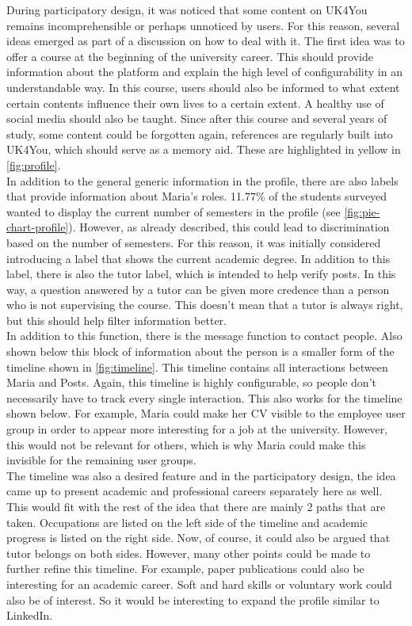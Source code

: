 During participatory design, it was noticed that some content on UK4You remains incomprehensible or perhaps unnoticed by users.
For this reason, several ideas emerged as part of a discussion on how to deal with it.
The first idea was to offer a course at the beginning of the university career.
This should provide information about the platform and explain the high level of configurability in an understandable way.
In this course, users should also be informed to what extent certain contents influence their own lives to a certain extent.
A healthy use of social media should also be taught.
Since after this course and several years of study, some content could be forgotten again, references are regularly built into UK4You, which should serve as a memory aid.
These are highlighted in yellow in \autoref{fig:profile}.\\

In addition to the general generic information in the profile, there are also labels that provide information about Maria's roles.
11.77\% of the students surveyed wanted to display the current number of semesters in the profile (see \autoref{fig:pie-chart-profile}).
However, as already described, this could lead to discrimination based on the number of semesters.
For this reason, it was initially considered introducing a label that shows the current academic degree.
In addition to this label, there is also the tutor label, which is intended to help verify posts.
In this way, a question answered by a tutor can be given more credence than a person who is not supervising the course.
This doesn't mean that a tutor is always right, but this should help filter information better.\\

In addition to this function, there is the message function to contact people.
Also shown below this block of information about the person is a smaller form of the timeline shown in \autoref{fig:timeline}.
This timeline contains all interactions between Maria and Posts.
Again, this timeline is highly configurable, so people don't necessarily have to track every single interaction.
This also works for the timeline shown below.
For example, Maria could make her CV visible to the employee user group in order to appear more interesting for a job at the university.
However, this would not be relevant for others, which is why Maria could make this invisible for the remaining user groups.\\

The timeline was also a desired feature and in the participatory design, the idea came up to present academic and professional careers separately here as well.
This would fit with the rest of the idea that there are mainly 2 paths that are taken.
Occupations are listed on the left side of the timeline and academic progress is listed on the right side.
Now, of course, it could also be argued that tutor belongs on both sides.
However, many other points could be made to further refine this timeline.
For example, paper publications could also be interesting for an academic career.
Soft and hard skills or voluntary work could also be of interest.
So it would be interesting to expand the profile similar to LinkedIn.\\

